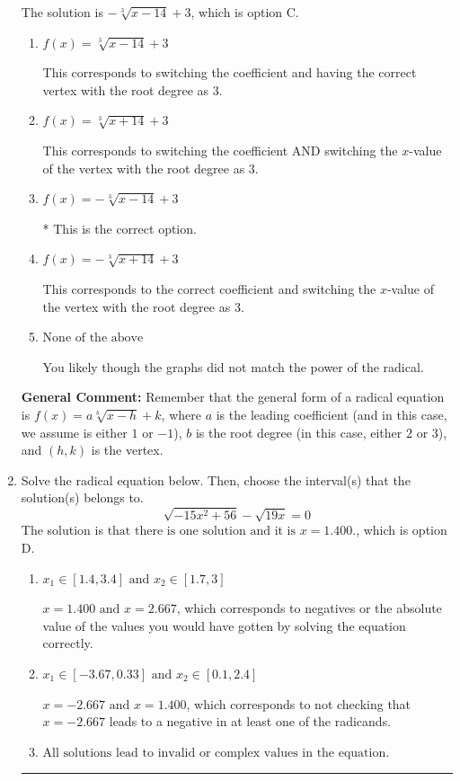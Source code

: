 \documentclass{extbook}[14pt]
\newcommand{\litem}[1]{\item #1

\rule{\textwidth}{0.4pt}}
\begin{document}
\begin{enumerate}
{The solution is \( - \sqrt[3]{x - 14} + 3 \), which is option C.\begin{enumerate}[label=\Alph*.]
\item \( f(x) = \sqrt[3]{x - 14} + 3 \)

This corresponds to switching the coefficient and having the correct vertex with the root degree as $3$.
\item \( f(x) = \sqrt[3]{x + 14} + 3 \)

This corresponds to switching the coefficient AND switching the $x$-value of the vertex with the root degree as $3$.
\item \( f(x) = - \sqrt[3]{x - 14} + 3 \)

* This is the correct option.
\item \( f(x) = - \sqrt[3]{x + 14} + 3 \)

This corresponds to the correct coefficient and switching the $x$-value of the vertex with the root degree as $3$.
\item \( \text{None of the above} \)

You likely though the graphs did not match the power of the radical.
\end{enumerate}

\textbf{General Comment:} Remember that the general form of a radical equation is $ f(x) = a \sqrt[b]{x - h} + k$, where $a$ is the leading coefficient (and in this case, we assume is either $1$ or $-1$), $b$ is the root degree (in this case, either $2$ or $3$), and $(h, k)$ is the vertex.
}
\litem{
Solve the radical equation below. Then, choose the interval(s) that the solution(s) belongs to.
\[ \sqrt{-15 x^2 + 56} - \sqrt{19 x} = 0 \]The solution is \( \text{that there is one solution and it is } x = 1.400. \), which is option D.\begin{enumerate}[label=\Alph*.]
\item \( x_1 \in [1.4, 3.4] \text{ and } x_2 \in [1.7,3] \)

$x = 1.400 \text{ and } x = 2.667$, which corresponds to negatives or the absolute value of the values you would have gotten by solving the equation correctly.
\item \( x_1 \in [-3.67, 0.33] \text{ and } x_2 \in [0.1,2.4] \)

$x = -2.667 \text{ and } x = 1.400$, which corresponds to not checking that $x = -2.667$ leads to a negative in at least one of the radicands.
\item \( \text{All solutions lead to invalid or complex values in the equation.} \)


\end{enumerate}}
\end{enumerate}
\end{document}
